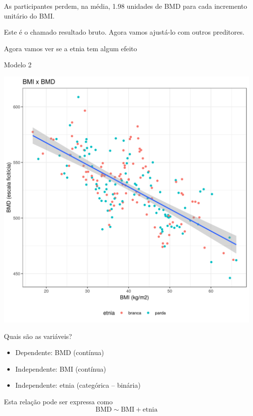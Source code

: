 \documentclass{beamer}
\begin{document}
\begin{frame}{\scriptsize }
  \begin{block}{}
    \footnotesize
    As participantes perdem, na média, 1.98 unidades de BMD para cada incremento unitário do BMI.

    \bigskip
    Este é o chamado resultado bruto. Agora vamos ajustá-lo com outros preditores.
  \end{block}
\end{frame}

\begin{frame}{\scriptsize }
  \begin{center}
    Agora vamos ver se a etnia tem algum efeito
  \end{center}
\end{frame}

\begin{frame}{\scriptsize Modelo 2}
  \begin{center}
    \includegraphics[height=.9\textheight]{Cap31-32/pratica-rlm2_0}
  \end{center}
\end{frame}

\begin{frame}{\scriptsize Quais são as variáveis?}
  \begin{itemize}
  \item Dependente: BMD (contínua)
  \item Independente: BMI (contínua)
  \item Independente: etnia (categórica -- binária)
  \end{itemize}
  \vfill
  \begin{block}{Esta relação pode ser expressa como}
    \footnotesize
    \begin{displaymath}
      \text{BMD} \sim \text{BMI} + \text{etnia}
    \end{displaymath}
  \end{block}
\end{frame}
\end{document}

